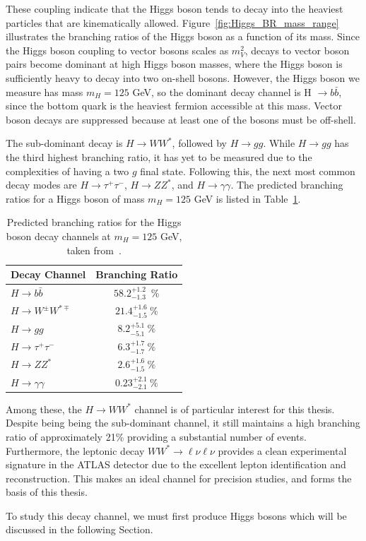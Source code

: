 These coupling indicate that the Higgs boson tends to decay into the heaviest particles that are kinematically allowed. Figure~\ref{fig:Higgs_BR_mass_range} illustrates the branching ratios of the Higgs boson as a function of its mass. Since the Higgs boson coupling to vector bosons scales as $m_{V}^{2}$, decays to vector boson pairs become dominant at high Higgs boson masses, where the Higgs boson is sufficiently heavy to decay into two on-shell bosons. However, the Higgs boson we measure has mass $m_{H} = 125$ GeV, so the dominant decay channel is H $\rightarrow b\bar{b}$, since the bottom quark is the heaviest fermion accessible at this mass. Vector boson decays are suppressed because at least one of the bosons must be off-shell. 

The sub-dominant decay is $H \rightarrow WW^{*}$, followed by $H \rightarrow gg$. While $H \rightarrow gg$ has the third highest branching ratio, it has yet to be measured due to the complexities of having a two $g$ final state. Following this, the next most common decay modes are $H \rightarrow \tau^{+}\tau^{-}$, $H \rightarrow ZZ^{*}$, and $H \rightarrow \gamma\gamma$. The predicted branching ratios for a Higgs boson of mass $m_{H} = 125$ GeV is listed in Table~\ref{tab:BRs}.

\begin{table}[h]
  \centering
  \begin{tabular}{l|c}
    \hline
    Decay Channel & Branching Ratio \\
    \hline
    $H \rightarrow b\bar{b}$ & $58.2^{+1.2}_{-1.3}$~\% \\
    $H \rightarrow W^{\pm}W^{*\mp}$ & $21.4^{+1.6}_{-1.5}~\%$ \\
    $H \rightarrow gg$ & $8.2^{+5.1}_{-5.1}~\%$ \\
    $H \rightarrow \tau^{+}\tau^{-}$ & $6.3^{+1.7}_{-1.7}~\%$ \\
    $H \rightarrow ZZ^{*}$ & $2.6^{+1.6}_{-1.5}~\%$ \\
    $H \rightarrow \gamma\gamma$ & $0.23^{+2.1}_{-2.1}~\%$ \\
    \hline
  \end{tabular}
  \caption{Predicted branching ratios for the Higgs boson decay channels at $m_{H} = 125$ GeV, taken from~\cite{LHC_Higgs_handbook}.}\label{tab:BRs}
\end{table}

Among these, the $H \rightarrow WW^{*}$ channel is of particular interest for this thesis. Despite being being the sub-dominant channel, it still maintains a high branching ratio of approximately 21\% providing a substantial number of events. Furthermore, the leptonic decay $WW^{*} \rightarrow \ell\nu\ell\nu$ provides a clean experimental signature in the ATLAS detector due to the excellent lepton identification and reconstruction. This makes an ideal channel for precision studies, and forms the basis of this thesis.

To study this decay channel, we must first produce Higgs bosons which will be discussed in the following Section.
